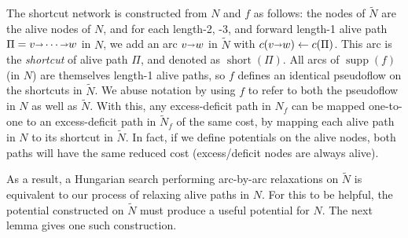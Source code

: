 \documentclass[11pt]{article}
\def\arcto{\mathord\shortrightarrow}
\def\arc#1#2{#1\arcto#2}
\def\short{\operatorname{short}}
\def\supp{\operatorname{supp}}
\numberwithin{figure}{section}
\def\EMPH#1{\textcolor{BrickRed}{{\emph{#1}}}}
\begin{document}
The shortcut network is constructed from $N$ and $f$ as follows:
the nodes of $\tilde{N}$ are the alive nodes of $N$, and for each length-2, -3,
and forward length-1 alive path $\Pi = v \arcto \cdots \arcto w$ in $N$,
we add an arc $\arc vw$ in $\tilde{N}$ with $c(\arc vw) \gets c(\Pi)$.
This arc is the \EMPH{shortcut} of alive path $\Pi$, and denoted as \EMPH{$\short(\Pi)$}.
All arcs of $\supp(f)$ (in $N$) are themselves length-1 alive paths, so $f$
defines an identical pseudoflow on the shortcuts in $\tilde{N}$.
We abuse notation by using $f$ to refer to both the pseudoflow in $N$ as well as $\tilde{N}$.
With this, any excess-deficit path in $N_f$ can be mapped one-to-one to an
excess-deficit path in $\tilde{N}_f$ of the same cost, by mapping each alive
path in $N$ to its shortcut in $\tilde{N}$.
In fact, if we define potentials on the alive nodes, both paths will have
the same reduced cost (excess/deficit nodes are always alive).

As a result, a Hungarian search performing arc-by-arc relaxations on $\tilde{N}$
is equivalent to our process of relaxing alive paths in $N$.
For this to be helpful, the potential constructed on $\tilde{N}$ must produce
a useful potential for $N$.
The next lemma gives one such construction.
\end{document}

